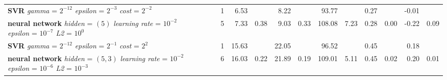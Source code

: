 {\begin{table}[ht]
\begin{tabular}{lllrrrrrrrrrrr}
  \makecell[tl]{\textbf{SVR}\\ \textit{gamma} = $2^{-12}$ \\ \textit{epsilon} = $2^{-3}$ \\ \textit{cost} = $2^{-2}$} & \cellcolor[HTML]{FFFF88}{summer} & \cellcolor[HTML]{EADAFF}{seasonal} &   1 & 6.53 &  & 8.22 &  & 93.77 &  & 0.27 &  & -0.01 &  \\ 
  \makecell[tl]{\textbf{neural network}\\ \textit{hidden} = $(5)$ \\ \textit{learning rate} = $10^{-2}$ \\ \textit{epsilon} = $10^{-7}$ \\ \textit{L2} = $10^{0}$} & \cellcolor[HTML]{FFFF88}{summer} & \cellcolor[HTML]{EADAFF}{seasonal} &   5 & 7.33 & 0.38 & 9.03 & 0.33 & 108.08 & 7.23 & 0.28 & 0.00 & -0.22 & 0.09 \\ 
  \makecell[tl]{\textbf{SVR}\\ \textit{gamma} = $2^{-12}$ \\ \textit{epsilon} = $2^{-1}$ \\ \textit{cost} = $2^{2}$} & \cellcolor[HTML]{FFAA88}{autumn} & \cellcolor[HTML]{FFFFFF}{all} &   1 & 15.63 &  & 22.05 &  & 96.52 &  & 0.45 &  & 0.18 &  \\ 
  \makecell[tl]{\textbf{neural network}\\ \textit{hidden} = $(5, 3)$ \\ \textit{learning rate} = $10^{-2}$ \\ \textit{epsilon} = $10^{-6}$ \\ \textit{L2} = $10^{-3}$} & \cellcolor[HTML]{FFAA88}{autumn} & \cellcolor[HTML]{FFFFFF}{all} &   6 & 16.03 & 0.22 & 21.89 & 0.19 & 109.01 & 5.11 & 0.45 & 0.02 & 0.20 & 0.01 \\ 
   \bottomrule
\end{tabular}
\endgroup
\end{table}

}
